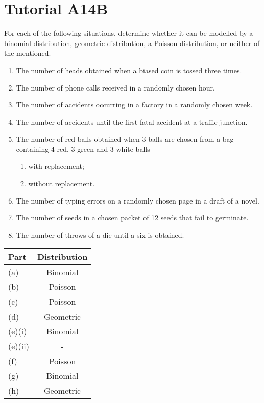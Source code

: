 \section{Tutorial A14B}

\begin{problem}
    For each of the following situations, determine whether it can be modelled by a binomial distribution, geometric distribution, a Poisson distribution, or neither of the mentioned.
    \begin{enumerate}
        \item The number of heads obtained when a biased coin is tossed three times.
        \item The number of phone calls received in a randomly chosen hour.
        \item The number of accidents occurring in a factory in a randomly chosen week.
        \item The number of accidents until the first fatal accident at a traffic junction.
        \item The number of red balls obtained when 3 balls are chosen from a bag containing 4 red, 3 green and 3 white balls
        \begin{enumerate}
            \item with replacement;
            \item without replacement.
        \end{enumerate}
        \item The number of typing errors on a randomly chosen page in a draft of a novel.
        \item The number of seeds in a chosen packet of 12 seeds that fail to germinate.
        \item The number of throws of a die until a six is obtained.
    \end{enumerate}
\end{problem}
\begin{solution}
    \begin{table}[H]
        \centering
        \begin{tabular}{|l|c|}
        \hline
        \textbf{Part} & \textbf{Distribution} \\ \hline\hline
        (a) & Binomial \\ \hline
        (b) & Poisson \\ \hline
        (c) & Poisson \\ \hline
        (d) & Geometric \\ \hline
        (e)(i) & Binomial \\ \hline
        (e)(ii) &  - \\ \hline
        (f) & Poisson \\ \hline
        (g) & Binomial \\ \hline
        (h) & Geometric \\ \hline
        \end{tabular}
    \end{table}
\end{solution}


